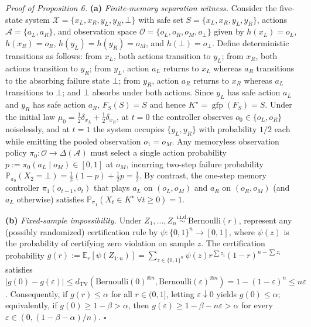 \documentclass[11pt,a4paper]{article}
\begin{document}
\emph{Proof of Proposition 6.} \textbf{(a)} \emph{Finite-memory
separation witness.} Consider the five-state system
\(\mathcal{X} = \{x_L, x_R, y_L, y_R, \bot\}\) with safe set
\(S = \{x_L, x_R, y_L, y_R\}\), actions \(\mathcal{A} = \{a_L, a_R\}\),
and observation space \(\mathcal{O} = \{o_L, o_R, o_M, o_\bot\}\) given
by \(h(x_L) = o_L\), \(h(x_R) = o_R\), \(h(y_L) = h(y_R) = o_M\), and
\(h(\bot) = o_\bot\). Define deterministic transitions as follows: from
\(x_L\), both actions transition to \(y_L\); from \(x_R\), both actions
transition to \(y_R\); from \(y_L\), action \(a_L\) returns to \(x_L\)
whereas \(a_R\) transitions to the absorbing failure state \(\bot\);
from \(y_R\), action \(a_R\) returns to \(x_R\) whereas \(a_L\)
transitions to \(\bot\); and \(\bot\) absorbs under both actions. Since
\(y_L\) has safe action \(a_L\) and \(y_R\) has safe action \(a_R\),
\(F_S(S) = S\) and hence \(K^\star = \operatorname{gfp}(F_S) = S\).
Under the initial law
\(\mu_0 = \frac{1}{2}\delta_{x_L} + \frac{1}{2}\delta_{x_R}\), at
\(t=0\) the controller observes \(o_0 \in \{o_L, o_R\}\) noiselessly,
and at \(t=1\) the system occupies \(\{y_L, y_R\}\) with probability
\(1/2\) each while emitting the pooled observation \(o_1 = o_M\). Any
memoryless observation policy
\(\pi_0: \mathcal{O} \to \Delta(\mathcal{A})\) must select a single
action probability \(p := \pi_0(a_L \mid o_M) \in [0,1]\) at \(o_M\),
incurring two-step failure probability
\(\mathbb{P}_{\pi_0}(X_2 = \bot) = \frac{1}{2}(1 - p) + \frac{1}{2} p = \frac{1}{2}\).
By contrast, the one-step memory controller \(\pi_1(o_{t-1}, o_t)\) that
plays \(a_L\) on \((o_L, o_M)\) and \(a_R\) on \((o_R, o_M)\) (and
\(a_L\) otherwise) satisfies
\(\mathbb{P}_{\pi_1}(X_t \in K^\star\ \forall t \ge 0) = 1\).

\textbf{(b)} \emph{Fixed-sample impossibility.} Under
\(Z_1, \dots, Z_n \stackrel{\mathrm{i.i.d.}}{\sim} \mathrm{Bernoulli}(r)\),
represent any (possibly randomized) certification rule by
\(\psi: \{0,1\}^n \to [0,1]\), where \(\psi(z)\) is the probability of
certifying zero violation on sample \(z\). The certification probability
\(g(r) := \mathbb{E}_r[\psi(Z_{1:n})] = \sum_{z \in \{0,1\}^n} \psi(z) r^{\sum z_i} (1-r)^{n - \sum z_i}\)
satisfies
\(|g(0) - g(\varepsilon)| \le d_{\mathrm{TV}}(\mathrm{Bernoulli}(0)^{\otimes n}, \mathrm{Bernoulli}(\varepsilon)^{\otimes n}) = 1 - (1-\varepsilon)^n \le n\varepsilon\).
Consequently, if \(g(r) \le \alpha\) for all \(r \in (0,1]\), letting
\(\varepsilon \downarrow 0\) yields \(g(0) \le \alpha\); equivalently,
if \(g(0) \ge 1 - \beta > \alpha\), then
\(g(\varepsilon) \ge 1 - \beta - n\varepsilon > \alpha\) for every
\(\varepsilon \in (0, (1 - \beta - \alpha)/n)\). \(\square\)
\end{document}
